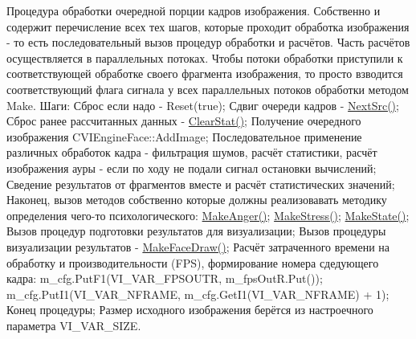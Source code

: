 Процедура обработки очередной порции кадров изображения. Собственно и содержит перечисление всех тех шагов, которые проходит обработка изображения -\/ то есть последовательный вызов процедур обработки и расчётов. Часть расчётов осуществляется в параллельных потоках. Чтобы потоки обработки приступили к соответствующей обработке своего фрагмента изображения, то просто взводится соответствующий флага сигнала у всех параллельных потоков обработки методом Make. Шаги\+: Сброс если надо -\/ Reset(true); Сдвиг очереди кадров -\/ \hyperlink{class_c_v_i_engine_base_aa1aa2604f40dd77bc49ca6ff8fd81535}{Next\+Src()}; Сброс ранее рассчитанных данных -\/ \hyperlink{class_c_v_i_engine_base_a10d6138a2c8f4c4c946bf930c268be6b}{Clear\+Stat()}; Получение очередного изображения C\+V\+I\+Engine\+Face\+::\+Add\+Image; Последовательное применение различных обработок кадра -\/ фильтрация шумов, расчёт статистики, расчёт изображения ауры -\/ если по ходу не подали сигнал остановки вычислений; Сведение результатов от фрагментов вместе и расчёт статистических значений; Наконец, вызов методов собственно которые должны реализовавать методику определения чего-\/то психологического\+: \hyperlink{class_c_v_i_engine_base_adf949a2b1abf18f519937d3f787c5abf}{Make\+Anger()}; \hyperlink{class_c_v_i_engine_base_a746c67a403f60418bf26e1e686db0c0c}{Make\+Stress()}; \hyperlink{class_c_v_i_engine_base_aa77b261660041465a8d3e68a7088dd0d}{Make\+State()}; Вызов процедур подготовки результатов для визуализации; Вызов процедуры визуализации результатов -\/ \hyperlink{class_c_v_i_engine_base_a18c5dc58d55a37295b3dd4c451fb86fc}{Make\+Face\+Draw()}; Расчёт затраченного времени на обработку и производительности (F\+P\+S), формирование номера сдедующего кадра\+: m\+\_\+cfg.\+Put\+F1(V\+I\+\_\+\+V\+A\+R\+\_\+\+F\+P\+S\+O\+U\+T\+R, m\+\_\+fps\+Out\+R.\+Put()); m\+\_\+cfg.\+Put\+I1(V\+I\+\_\+\+V\+A\+R\+\_\+\+N\+F\+R\+A\+M\+E, m\+\_\+cfg.\+Get\+I1(\+V\+I\+\_\+\+V\+A\+R\+\_\+\+N\+F\+R\+A\+M\+E) + 1); Конец процедуры; Размер исходного изображения берётся из настроечного параметра V\+I\+\_\+\+V\+A\+R\+\_\+\+S\+I\+Z\+E. 



